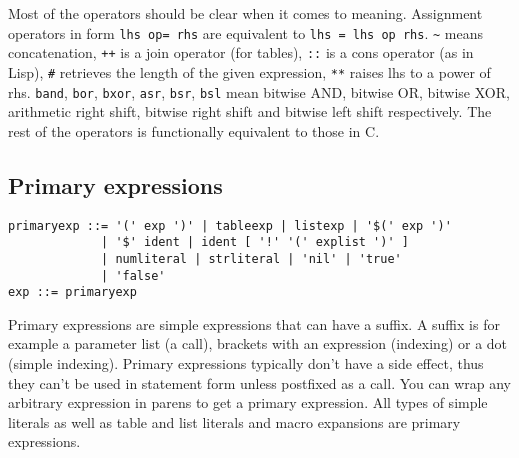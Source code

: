 \documentclass{article}
\begin{document}
Most of the operators should be clear when it comes to meaning. Assignment
operators in form \verb|lhs op= rhs| are equivalent to \verb|lhs = lhs op rhs|.
\verb|~| means concatenation, \verb|++| is a join operator (for tables),
\verb|::| is a cons operator (as in Lisp), \verb|#| retrieves the length
of the given expression, \verb|**| raises lhs to a power of rhs. \verb|band|,
\verb|bor|, \verb|bxor|, \verb|asr|, \verb|bsr|, \verb|bsl| mean bitwise AND,
bitwise OR, bitwise XOR, arithmetic right shift, bitwise right shift and
bitwise left shift respectively. The rest of the operators is functionally
equivalent to those in C.
\subsection{Primary expressions}
\begin{lstlisting}[language=bnf]
primaryexp ::= '(' exp ')' | tableexp | listexp | '$(' exp ')'
             | '$' ident | ident [ '!' '(' explist ')' ]
             | numliteral | strliteral | 'nil' | 'true'
             | 'false'
exp ::= primaryexp
\end{lstlisting}
Primary expressions are simple expressions that can have a suffix. A suffix
is for example a parameter list (a call), brackets with an expression
(indexing) or a dot (simple indexing). Primary expressions typically don't
have a side effect, thus they can't be used in statement form unless postfixed
as a call. You can wrap any arbitrary expression in parens to get a primary
expression. All types of simple literals as well as table and list literals
and macro expansions are primary expressions.
\end{document}
